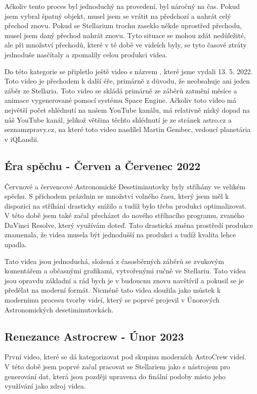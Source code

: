 \documentclass[12pt,a4paper,titlepage]{article}
\begin{document}
Ačkoliv tento proces byl jednoduchý na provedení, byl náročný na čas. Pokud jsem vybral špatný objekt, musel jsem se vrátit na předchozí a nahrát celý přechod znovu. Pokud se Stellarium trochu zaseklo někde uprostřed přechodu, musel jsem daný přechod nahrát znovu. Tyto situace se mohou zdát nedůležité, ale při množství přechodů, které v té době ve videích byly, se tyto časové ztráty jednoduše nasčítaly a zpomalily celou produkci videa.

Do této kategorie se připletlo ještě video s názvem , které jsme vydali 13. 5. 2022. Toto video je přechodem k další éře, primárně z důvodu, že neobsahuje ani jeden záběr ze Stellaria. Toto video se skládá primárně ze záběrů zatmění měsíce a animace vygenerované pomocí systému Space Engine. Ačkoliv toto video má největší počet shlédnutí na našem YouTube kanálu, má relativně nízký dopad na náš YouTube kanál, jelikož většina těchto shlédnutí je ze stránek astro.cz a seznamzpravy.cz, na které toto video nasdílel Martin Gembec, vedoucí planetária v iQLandii.
\subsection{Éra spěchu - Červen a Červenec 2022}
Červnové a červencové Astronomické Desetiminutovky byly stříhány ve velikém spěchu. S příchodem prázdnin se množství volného času, který jsem měl k dispozici na stříhání drasticky snížilo a tudíž bylo třeba produkci optimalizovat. V této době jsem také začal přecházet do nového stříhacího programu, zvaného DaVinci Resolve, který využívám doteď. Tato drastická změna prostředí produkce znamenala, že videa musela být jednodušší na produkci a tudíž kvalita lehce upadla. 

Tato videa jsou jednoduchá, složená z časosběrných záběrů se zvukovým komentářem a občasnými grafikami, vytvořenými ručně ve Stellariu. Tato videa jsou opravdu základní a rád bych je v budoucnu znovu navštívil a pokusil se je předělat na moderní formát. Nicméně tato videa sloužila jako můstek k modernímu procesu tvorby videí, který se poprvé projevil v Únorových Astronomických desetiminutovkách.
\subsection{Renezance Astrocrew - Únor 2023}
První video, které se dá kategorizovat pod skupinu moderních AstroCrew videí. V této době jsem poprvé začal pracovat se Stellariem jako s nástrojem pro generování dat, která jsou později upravena do finální podoby místo jeho využívání jako zdroj videa. 
\end{document}
